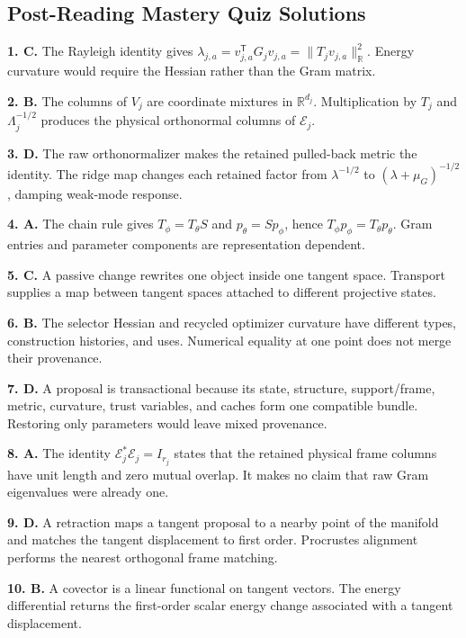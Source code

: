 \documentclass[10pt,twocolumn]{article}
\begin{document}
\subsection*{Post-Reading Mastery Quiz Solutions}

\textbf{1. C.} The Rayleigh identity gives
\(\lambda_{j,a}=v_{j,a}^{\mathsf T}G_jv_{j,a}
=\|T_jv_{j,a}\|_{\mathbb R}^2\). Energy curvature would require the Hessian
rather than the Gram matrix.

\textbf{2. B.} The columns of \(V_j\) are coordinate mixtures in
\(\mathbb R^{d_j}\). Multiplication by
\(T_j\) and \(\Lambda_j^{-1/2}\) produces the physical orthonormal columns of
\(\mathcal E_j\).

\textbf{3. D.} The raw orthonormalizer makes the retained pulled-back metric
the identity. The ridge map changes each retained factor from
\(\lambda^{-1/2}\) to \((\lambda+\mu_G)^{-1/2}\), damping weak-mode response.

\textbf{4. A.} The chain rule gives \(T_\phi=T_\theta S\) and
\(p_\theta=Sp_\phi\), hence
\(T_\phi p_\phi=T_\theta p_\theta\). Gram entries and parameter components are
representation dependent.

\textbf{5. C.} A passive change rewrites one object inside one tangent space.
Transport supplies a map between tangent spaces attached to different
projective states.

\textbf{6. B.} The selector Hessian and recycled optimizer curvature have
different types, construction histories, and uses. Numerical equality at one
point does not merge their provenance.

\textbf{7. D.} A proposal is transactional because its state, structure,
support/frame, metric, curvature, trust variables, and caches form one
compatible bundle. Restoring only parameters would leave mixed provenance.

\textbf{8. A.} The identity
\(\mathcal E_j^*\mathcal E_j=I_{r_j}\) states that the retained physical frame
columns have unit length and zero mutual overlap. It makes no claim that raw
Gram eigenvalues were already one.

\textbf{9. D.} A retraction maps a tangent proposal to a nearby point of the
manifold and matches the tangent displacement to first order. Procrustes
alignment performs the nearest orthogonal frame matching.

\textbf{10. B.} A covector is a linear functional on tangent vectors. The
energy differential returns the first-order scalar energy change associated
with a tangent displacement.
\end{document}
